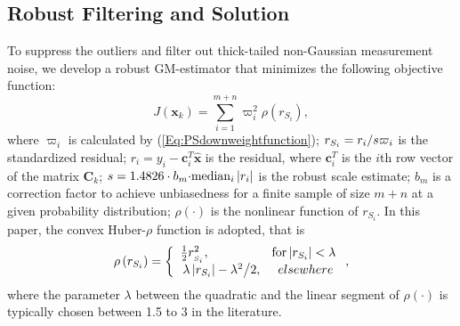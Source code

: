 \documentclass[10pt]{IEEEtran}
\begin{document}
\subsection{Robust Filtering and Solution}
To suppress the outliers and filter out thick-tailed non-Gaussian measurement noise, we develop a robust GM-estimator that minimizes the following objective function:
\begin{equation}
J\left( \bm{x}_k \right) = \sum\limits_{i = 1}^{m+n} {\varpi _i^2} \rho \left( {{r_{{S_i}}}} \right),
\label{Eq:objectivefunction}
\end{equation}
where $\varpi _i$ is calculated by (\ref{Eq:PSdownweightfunction}); ${r_{{S_i}}} = {{{r_i}} \mathord{\left/{\vphantom {{{\bm{r}_i}} {s{\varpi _i}}}} \right.\kern-\nulldelimiterspace} {s{\varpi _i}}}$ is the standardized residual; ${r_i} = {y_i} -\bm{c}_i^T \bm{\widehat x}$ is the residual, where $\bm{c}_i^T$ is the $i$th row vector of the matrix $\bm{C}_k$; $s = 1.4826\cdot b_m{\rm{\cdot}}\text{median}_i\left| {{r_i}}\right|$ is the robust scale estimate; $b_m$ is a correction factor to achieve unbiasedness for a finite sample of size $m+n$ at a given probability distribution; $\rho(\cdot)$ is the nonlinear function of ${r_{{S_i}}}$. In this paper, the convex Huber-$\rho$ function \cite{Huber1981} is adopted, that is
\begin{equation}
\rho \left( {{r_{{S_i}}}} \right) = \left\{ {\begin{array}{*{20}{c}}
{\frac{1}{2}r_{_{{S_i}}}^2,{\rm{ \quad\quad\quad\quad  \quad            for }}\left| {{r_{{S_i}}}} \right| < \lambda}\\
{\lambda\left| {{r_{{S_i}}}} \right| - {{{\lambda^2}} \mathord{\left/
 {\vphantom {{{\lambda^2}} 2}} \right.
 \kern-\nulldelimiterspace} 2},{\rm{ \quad\; }}elsewhere}
\end{array}} \right.,
\label{Eq:huberfunction}
\end{equation}
where the parameter $\lambda$ between the quadratic and the linear segment of $\rho(\cdot)$ is typically chosen between 1.5 to 3 in the literature.
\end{document}
